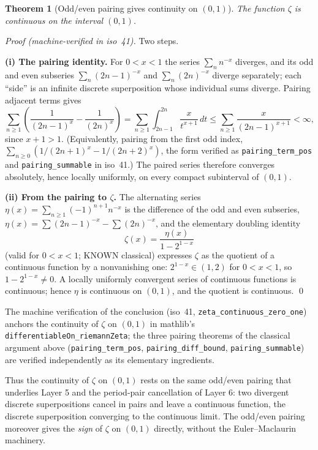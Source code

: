 \documentclass{article}
\newtheorem{theorem}{Theorem}[section]
\newcommand{\zt}{\zeta}
\begin{document}
\begin{theorem}[Odd/even pairing gives continuity on $(0,1)$]
\label{thm:contbridge}
The function $\zt$ is continuous on the interval $(0,1)$.
\end{theorem}

\emph{Proof (machine-verified in iso~41).}
Two steps.

\textbf{(i) The pairing identity.} For $0<x<1$ the series $\sum_n n^{-x}$
diverges, and its odd and even subseries $\sum_n(2n-1)^{-x}$ and
$\sum_n(2n)^{-x}$ diverge separately; each ``side'' is an infinite discrete
superposition whose individual sums diverge. Pairing adjacent terms gives
\[
\sum_{n\ge1}\left(\frac1{(2n-1)^x}-\frac1{(2n)^x}\right)
=\sum_{n\ge1}\int_{2n-1}^{2n}\frac{x}{t^{x+1}}\,dt
\le\sum_{n\ge1}\frac{x}{(2n-1)^{x+1}}<\infty,
\]
since $x+1>1$. (Equivalently, pairing from the first odd index,
$\sum_{n\ge 0}(1/(2n+1)^x-1/(2n+2)^x)$, the form verified as
\texttt{pairing\_term\_pos} and \texttt{pairing\_summable} in iso~41.)
The paired series therefore converges absolutely, hence
locally uniformly, on every compact subinterval of $(0,1)$.

\textbf{(ii) From the pairing to $\zt$.} The alternating series
$\eta(x)=\sum_{n\ge1}(-1)^{n+1}n^{-x}$ is the difference of the odd and
even subseries, $\eta(x)=\sum(2n-1)^{-x}-\sum(2n)^{-x}$, and the elementary
doubling identity
\[
\zt(x)=\frac{\eta(x)}{1-2^{1-x}}
\]
(valid for $0<x<1$; KNOWN classical) expresses $\zt$ as the quotient of a
continuous function by a nonvanishing one: $2^{1-x}\in(1,2)$ for
$0<x<1$, so $1-2^{1-x}\neq0$. A locally uniformly convergent series of
continuous functions is continuous; hence $\eta$ is continuous on $(0,1)$,
and the quotient is continuous. \qed

The machine verification of the conclusion (iso~41,
\texttt{zeta\_continuous\_zero\_one}) anchors the continuity of $\zt$ on
$(0,1)$ in mathlib's \texttt{differentiableOn\_riemannZeta}; the three
pairing theorems of the classical argument above
(\texttt{pairing\_term\_pos}, \texttt{pairing\_diff\_bound},
\texttt{pairing\_summable}) are verified independently as its elementary
ingredients.

Thus the continuity of $\zt$ on $(0,1)$ rests on the same odd/even pairing
that underlies Layer 5 and the period-pair cancellation of Layer 6: two
divergent discrete superpositions cancel in pairs and leave a continuous
function, the discrete superposition converging to the continuous limit.
The odd/even pairing moreover gives the \emph{sign} of $\zt$ on $(0,1)$
directly, without the Euler--Maclaurin machinery.
\end{document}
